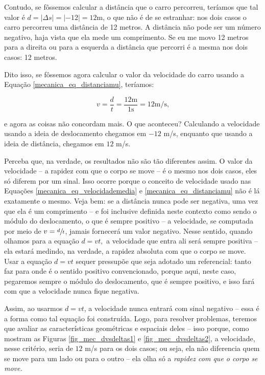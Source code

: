 Contudo, se fôssemos calcular a distância que o carro percorreu, teríamos que tal valor é $d=|\Delta s| = |-12|=12$m, o que não é de se estranhar: nos dois casos o carro percorreu uma distância de 12 metros. A distância não pode ser um número negativo, haja vista que ela mede um comprimento. Se eu me movo 12 metros para a direita ou para a esquerda a distância que percorri é a mesma nos dois casos: 12 metros.

Dito isso, se fôssemos agora calcular o valor da velocidade do carro usando a Equação \eqref{mecanica_eq_distanciamu}, teríamos:

$$ v = \dfrac{d}{t}=\dfrac{12\text{m}}{1\text{s}}=12 \text{m/s,}$$

\noindent e agora as coisas não concordam mais. O que aconteceu? Calculando a velocidade usando a ideia de deslocamento chegamos em $-12$ m/s, enquanto que usando a ideia de distância, chegamos em $12$ m/s.

Perceba que, na verdade, os resultados não são tão diferentes assim. O valor da velocidade -- a rapidez com que o corpo se move -- é o mesmo nos dois casos, eles só diferem por um sinal. Isso ocorre porque o conceito de velocidade usado nas Equações \eqref{mecanica_eq_velocidademedia} e \eqref{mecanica_eq_distanciamu} não é lá exatamente o mesmo. Veja bem: se a distância nunca pode ser negativa, uma vez que ela é um comprimento -- e foi inclusive definida neste contexto como sendo o módulo do deslocamento, o que é sempre positivo -- a velocidade, se computada por meio de $v=\sfrac{d}{t}$, jamais fornecerá um valor negativo. Nesse sentido, quando olhamos para a equação $d=vt,$ a velocidade que entra ali será sempre positiva -- ela estará medindo, na verdade, a rapidez absoluta com que o corpo se move. Usar a equação $d=vt$ sequer pressupõe que seja adotado um referencial: tanto faz para onde é o sentido positivo convencionado, porque aqui, neste caso, pegaremos sempre o módulo do deslocamento, que é sempre positivo, e isso fará com que a velocidade nunca fique negativa.

Assim, ao usarmos $d=vt$, a velocidade nunca entrará com sinal negativo -- essa é a forma como tal equação foi construída. Logo, para resolver problemas, teremos que avaliar as características geométricas e espaciais deles -- isso porque, como mostram as Figuras \ref{fig_mec_dvsdeltas1} e \ref{fig_mec_dvsdeltas2}, a velocidade, nesse critério, seria de $12$ m/s para os dois casos; ou seja, ela não diferencia quem se move para um lado ou para o outro -- ela olha só a \textit{rapidez com que o corpo se move.}

